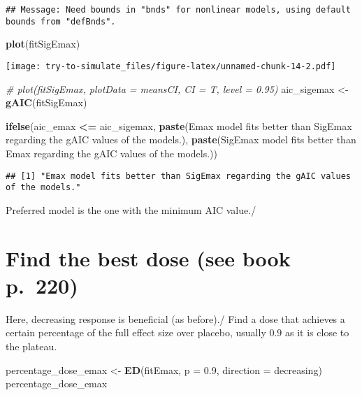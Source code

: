 \documentclass[
]{article}
\newenvironment{Shaded}{\begin{snugshade}}{\end{snugshade}}
\newcommand{\AttributeTok}[1]{\textcolor[rgb]{0.13,0.29,0.53}{#1}}
\newcommand{\CommentTok}[1]{\textcolor[rgb]{0.56,0.35,0.01}{\textit{#1}}}
\newcommand{\FloatTok}[1]{\textcolor[rgb]{0.00,0.00,0.81}{#1}}
\newcommand{\FunctionTok}[1]{\textcolor[rgb]{0.13,0.29,0.53}{\textbf{#1}}}
\newcommand{\NormalTok}[1]{#1}
\newcommand{\OtherTok}[1]{\textcolor[rgb]{0.56,0.35,0.01}{#1}}
\newcommand{\SpecialCharTok}[1]{\textcolor[rgb]{0.81,0.36,0.00}{\textbf{#1}}}
\newcommand{\StringTok}[1]{\textcolor[rgb]{0.31,0.60,0.02}{#1}}
\begin{document}
\begin{verbatim}
## Message: Need bounds in "bnds" for nonlinear models, using default bounds from "defBnds".
\end{verbatim}

\begin{Shaded}
\begin{Highlighting}[]
\FunctionTok{plot}\NormalTok{(fitSigEmax)}
\end{Highlighting}
\end{Shaded}

\texttt{[image: try-to-simulate\_files/figure-latex/unnamed-chunk-14-2.pdf]}

\begin{Shaded}
\begin{Highlighting}[]
\CommentTok{\# plot(fitSigEmax, plotData = \textquotesingle{}meansCI\textquotesingle{}, CI = T, level = 0.95)}
\NormalTok{aic\_sigemax }\OtherTok{\textless{}{-}} \FunctionTok{gAIC}\NormalTok{(fitSigEmax) }

\FunctionTok{ifelse}\NormalTok{(aic\_emax }\SpecialCharTok{\textless{}=}\NormalTok{ aic\_sigemax, }
       \FunctionTok{paste}\NormalTok{(}\StringTok{\textquotesingle{}Emax model fits better than SigEmax regarding the gAIC values of the models.\textquotesingle{}}\NormalTok{),}
       \FunctionTok{paste}\NormalTok{(}\StringTok{\textquotesingle{}SigEmax model fits better than Emax regarding the gAIC values of the models.\textquotesingle{}}\NormalTok{))}
\end{Highlighting}
\end{Shaded}

\begin{verbatim}
## [1] "Emax model fits better than SigEmax regarding the gAIC values of the models."
\end{verbatim}

Preferred model is the one with the minimum AIC value./

\hypertarget{find-the-best-dose-see-book-p.-220}{%
\section{Find the best dose (see book
p.~220)}\label{find-the-best-dose-see-book-p.-220}}

Here, decreasing response is beneficial (as before)./ Find a dose that
achieves a certain percentage of the full effect size over placebo,
usually \(0.9\) as it is close to the plateau.

\begin{Shaded}
\begin{Highlighting}[]
\NormalTok{percentage\_dose\_emax }\OtherTok{\textless{}{-}} \FunctionTok{ED}\NormalTok{(fitEmax, }\AttributeTok{p =} \FloatTok{0.9}\NormalTok{, }\AttributeTok{direction =} \StringTok{\textquotesingle{}decreasing\textquotesingle{}}\NormalTok{)}
\NormalTok{percentage\_dose\_emax}
\end{Highlighting}
\end{Shaded}
\end{document}

